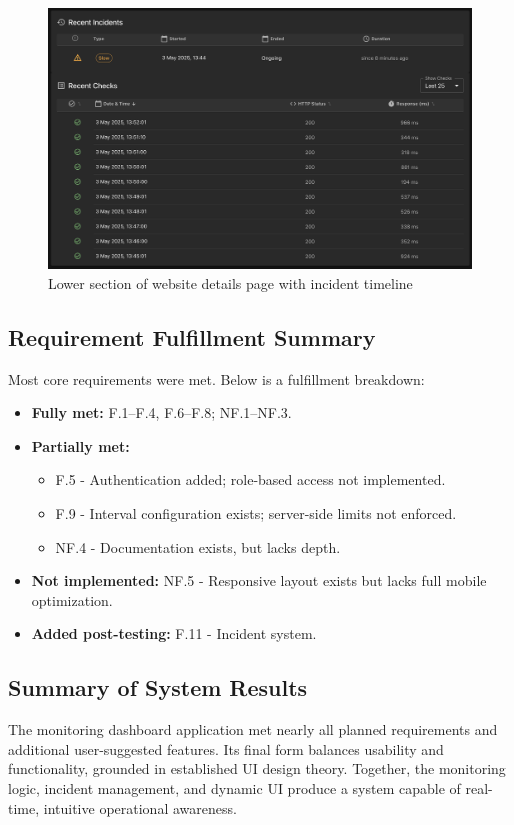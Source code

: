 \begin{figure}[H]
    \centering
    \includegraphics[width=1\linewidth]{figures/websiteDetails_bottom.png}
    \caption{Lower section of website details page with incident timeline}
\end{figure}

\subsection{Requirement Fulfillment Summary}
\label{subsec:req_fulfillment_results}

Most core requirements were met. Below is a fulfillment breakdown:

\begin{itemize}
    \item \textbf{Fully met:} F.1–F.4, F.6–F.8; NF.1–NF.3.
    \item \textbf{Partially met:}
    \begin{itemize}
        \item F.5 - Authentication added; role-based access not implemented.
        \item F.9 - Interval configuration exists; server-side limits not enforced.
        \item NF.4 - Documentation exists, but lacks depth.
    \end{itemize}
    \item \textbf{Not implemented:} NF.5 - Responsive layout exists but lacks full mobile optimization.
    \item \textbf{Added post-testing:} F.11 - Incident system.
\end{itemize}

\subsection{Summary of System Results}
The monitoring dashboard application met nearly all planned requirements and additional user-suggested features. Its final form balances usability and functionality, grounded in established UI design theory. Together, the monitoring logic, incident management, and dynamic UI produce a system capable of real-time, intuitive operational awareness.

